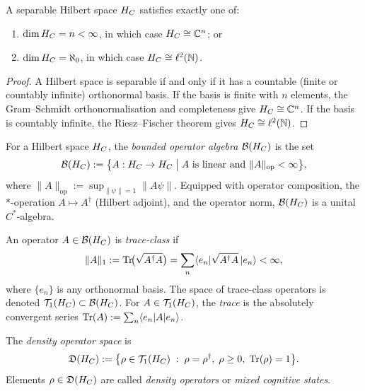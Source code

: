 \begin{lemma}
\label{lem:3.4}
A separable Hilbert space $H_C$ satisfies exactly one of:
\begin{enumerate}
  \item[(i)] $\dim H_C = n < \infty$, in which case $H_C \cong \mathbb{C}^n$; or
  \item[(ii)] $\dim H_C = \aleph_0$, in which case $H_C \cong \ell^2(\mathbb{N})$.
\end{enumerate}
\end{lemma}

\begin{proof}
A Hilbert space is separable if and only if it has a countable (finite
or countably infinite) orthonormal basis.  If the basis is finite with
$n$ elements, the Gram--Schmidt orthonormalisation and completeness give
$H_C \cong \mathbb{C}^n$.  If the basis is countably infinite, the
Riesz--Fischer theorem gives $H_C \cong \ell^2(\mathbb{N})$.
\end{proof}

\begin{definition}
\label{def:3.12}
For a Hilbert space $H_C$, the \emph{bounded operator algebra}
$\mathcal{B}(H_C)$ is the set
\[
  \mathcal{B}(H_C) := \bigl\{ A : H_C \to H_C \;\big|\;
    A \text{ is linear and } \|A\|_{\mathrm{op}} < \infty \bigr\},
\]
where $\|A\|_{\mathrm{op}} := \sup_{\|\psi\|=1} \|A\psi\|$.  Equipped
with operator composition, the $*$-operation $A \mapsto A^\dagger$
(Hilbert adjoint), and the operator norm, $\mathcal{B}(H_C)$ is a unital
$C^*$-algebra.
\end{definition}

\begin{definition}
\label{def:3.13}
An operator $A \in \mathcal{B}(H_C)$ is \emph{trace-class} if
\[
  \|A\|_1 := \mathrm{Tr}\!\bigl(\sqrt{A^\dagger A}\bigr)
  = \sum_{n} \langle e_n | \sqrt{A^\dagger A} \, | e_n \rangle < \infty,
\]
where $\{e_n\}$ is any orthonormal basis.  The space of trace-class
operators is denoted $\mathcal{T}_1(H_C) \subset \mathcal{B}(H_C)$.  For
$A \in \mathcal{T}_1(H_C)$, the \emph{trace} is the absolutely
convergent series $\mathrm{Tr}(A) := \sum_n \langle e_n | A | e_n \rangle$.
\end{definition}

\begin{definition}
\label{def:3.14}
The \emph{density operator space} is
\[
  \mathfrak{D}(H_C) := \bigl\{
    \rho \in \mathcal{T}_1(H_C) \;:\;
    \rho = \rho^\dagger,\;
    \rho \geq 0,\;
    \mathrm{Tr}(\rho) = 1
  \bigr\}.
\]
Elements $\rho \in \mathfrak{D}(H_C)$ are called \emph{density operators}
or \emph{mixed cognitive states}.
\end{definition}

